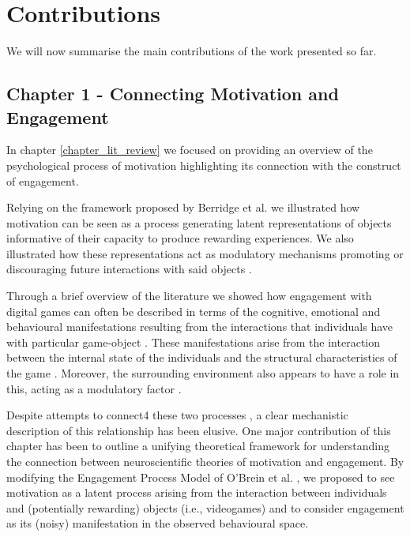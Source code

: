\section{Contributions}

We will now summarise the main contributions of the work presented so far. 

\subsection{Chapter 1 - Connecting Motivation and Engagement}
\label{discussion_chapter_one}
In chapter \ref{chapter_lit_review} we focused on providing an overview of the psychological process of motivation highlighting its connection with the construct of engagement.

Relying on the framework proposed by Berridge et al. \cite{berridge1998role} we illustrated how motivation can be seen as a process generating latent representations of objects informative of their capacity to produce rewarding experiences. We also illustrated how these representations act as modulatory mechanisms promoting or discouraging future interactions with said objects \cite{berridge2004motivation}.

Through a brief overview of the literature we showed how engagement with digital games can often be described in terms of the cognitive, emotional and behavioural manifestations resulting from the interactions that individuals have with particular game-object \cite{boyle2012engagement, jennett2008measuring, przybylski2010motivational}. These manifestations arise from the interaction between the internal state of the individuals and the structural characteristics of the game \cite{lucas2004sex,o2008user,jennett2008measuring,boyle2012engagement,connolly2012systematic,csikszentmihalyi2014toward}. Moreover, the surrounding environment also appears to have a role in this, acting as a modulatory factor \cite{o2008user, bialas2014cultural, vihanga2019weekly, zendle2022transnational}.

Despite attempts to connect4 these two processes \cite{przybylski2010motivational, nacke2011brainhex, deterding2022mastering}, a clear mechanistic description of this relationship has been elusive. One major contribution of this chapter has been to outline a unifying theoretical framework for understanding the connection between neuroscientific theories of motivation and engagement. By modifying the Engagement Process Model of O'Brein et al. \cite{o2008usero}, we proposed to see motivation as a latent process arising from the interaction between individuals and (potentially rewarding) objects (i.e., videogames) and to consider engagement as its (noisy) manifestation in the observed behavioural space. 

